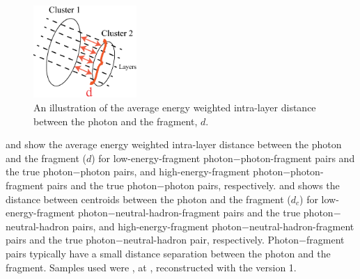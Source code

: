 \begin{figure}[tbph]
\centering
\includegraphics[width=0.35\textwidth]{photon/dLayer2}
\caption{An illustration of  the average energy weighted intra-layer distance between the photon and the fragment, $d$.}
\label{fig:photonDistanceMetric}
\end{figure}

 and  show the average energy weighted intra-layer distance between the photon and the fragment ($d$) for  low-energy-fragment photon$-$photon-fragment pairs and the true photon$-$photon pairs, and high-energy-fragment photon$-$photon-fragment pairs and the true photon$-$photon pairs, respectively.  and  shows the distance between centroids between  the photon and the fragment ($d_c$)  for  low-energy-fragment photon$-$neutral-hadron-fragment pairs and the true photon$-$neutral-hadron pairs, and  high-energy-fragment photon$-$neutral-hadron-fragment pairs and the true photon$-$neutral-hadron pair, respectively. Photon$-$fragment pairs typically have a small distance separation between the photon and the fragment. Samples used were \eeZuds, at , reconstructed with the \pandora version 1.


